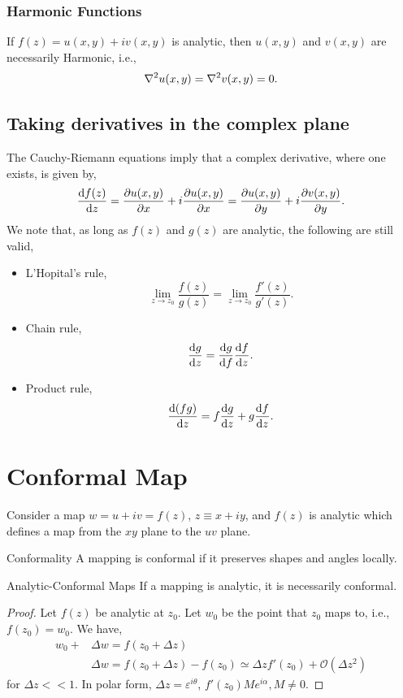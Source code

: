 \documentclass{book}
\begin{document}
\subsubsection{Harmonic Functions}
If $f(z) = u(x,y) + iv(x,y)$ is analytic, then $u(x,y)$ and $v(x,y)$ are necessarily Harmonic, i.e.,
\begin{equation}
	\laplacian{u(x,y)} = \laplacian{v(x,y)} = 0.
\end{equation}
\subsection{Taking derivatives in the complex plane}
The Cauchy-Riemann equations imply that a complex derivative, where one exists, is given by,
\begin{equation}
	\dv{f(z)}{z} = \pdv{u(x,y)}{x} + i\pdv{u(x,y)}{x} = \pdv{u(x,y)}{y} + i\pdv{v(x,y)}{y}.
\end{equation}
We note that, as long as $f(z)$ and $g(z)$ are analytic, the following are still valid,
\begin{itemize}
	\item L'Hopital's rule,
	\begin{equation}
		\lim_{z \to z_0} \frac{f(z)}{g(z)} = \lim_{z \to z_0}\frac{f'(z)}{g'(z)}.
	\end{equation}
	\item Chain rule,
	\begin{equation}
		\dv{g}{z} = \dv{g}{f}\dv{f}{z}.
	\end{equation}
	\item Product rule,
	\begin{equation}
		\dv{(fg)}{z} = f\dv{g}{z} + g\dv{f}{z}.
	\end{equation}
\end{itemize}
\section{Conformal Map}
Consider a map $w = u + iv = f(z)$, $z\equiv x + iy$, and $f(z)$ is analytic which defines a map from the $xy$ plane to the $uv$ plane. 
\begin{Definitions}{Conformality}{}
	A mapping is conformal if it preserves shapes and angles locally.
\end{Definitions}
\begin{Theorems}{Analytic-Conformal Maps}{}
	If a mapping is analytic, it is necessarily conformal.
\end{Theorems}
\begin{proof}
	Let $f(z)$ be analytic at $z_0$. Let $w_0$ be the point that $z_0$ maps to, i.e., $f(z_0) = w_0$. We have,
	\begin{align}
		w_0 + & \Delta w = f(z_0 + \Delta z) \\
		& \Delta w = f(z_0 + \Delta z) - f(z_0) \simeq \Delta z f'(z_0) + \mathcal{O}(\Delta z^2)
	\end{align}
	for $\Delta z << 1$. In polar form, $\Delta z = \varepsilon^{i\theta}$, $f'(z_0)Me^{i\alpha}, M \neq 0$.
\end{proof}
\end{document}
